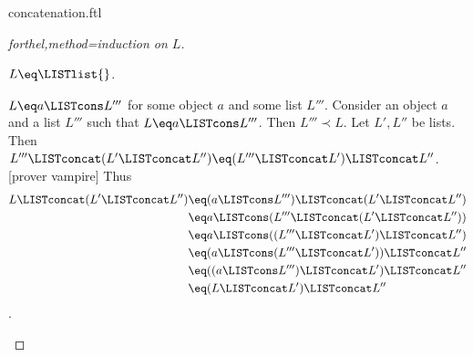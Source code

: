 \documentclass{naproche-library}
\begin{document}
\begin{smodule}[title=Concatenation]{concatenation.ftl}
\begin{proof}[forthel,method=induction on $L$]
  \begin{case}{$L \eq \LISTlist{}$.} \end{case}

  \begin{case}{$L \eq a \LISTcons L'''$ for some object $a$ and some list $L'''$.}
    Consider an object $a$ and a list $L'''$ such that $L \eq a \LISTcons L'''$.
    Then $L''' \prec L$.
    Let $L',L''$ be lists.
    Then $L''' \LISTconcat (L' \LISTconcat L'') \eq (L''' \LISTconcat L') \LISTconcat L''$.
    [prover vampire]
    Thus
    \begin{align*}
      L \LISTconcat (L' \LISTconcat L'') 
        &\eq (a \LISTcons L''') \LISTconcat (L' \LISTconcat L'')\\
        &\eq a \LISTcons (L''' \LISTconcat (L' \LISTconcat L''))\\
        &\eq a \LISTcons ((L''' \LISTconcat L') \LISTconcat L'')\\
        &\eq (a \LISTcons (L''' \LISTconcat L')) \LISTconcat L''\\
        &\eq ((a \LISTcons L''') \LISTconcat L') \LISTconcat L''\\
        &\eq (L \LISTconcat L') \LISTconcat L''
    \end{align*}.
  \end{case}
\end{proof}
\end{smodule}
\end{document}

